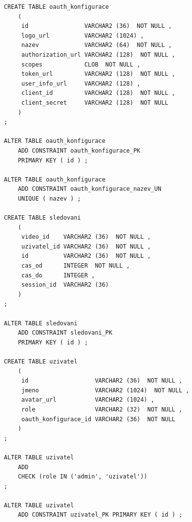 \documentclass[12pt,a4paper]{article}
\begin{document}
\begin{lstlisting}
CREATE TABLE oauth_konfigurace
    (
     id                VARCHAR2 (36)  NOT NULL ,
     logo_url          VARCHAR2 (1024) ,
     nazev             VARCHAR2 (64)  NOT NULL ,
     authorization_url VARCHAR2 (128)  NOT NULL ,
     scopes            CLOB  NOT NULL ,
     token_url         VARCHAR2 (128)  NOT NULL ,
     user_info_url     VARCHAR2 (128) ,
     client_id         VARCHAR2 (128)  NOT NULL ,
     client_secret     VARCHAR2 (128)  NOT NULL
    )
;

ALTER TABLE oauth_konfigurace
    ADD CONSTRAINT oauth_konfigurace_PK
    PRIMARY KEY ( id ) ;

ALTER TABLE oauth_konfigurace
    ADD CONSTRAINT oauth_konfigurace_nazev_UN
    UNIQUE ( nazev ) ;

CREATE TABLE sledovani
    (
     video_id    VARCHAR2 (36)  NOT NULL ,
     uzivatel_id VARCHAR2 (36)  NOT NULL ,
     id          VARCHAR2 (36)  NOT NULL ,
     cas_od      INTEGER  NOT NULL ,
     cas_do      INTEGER ,
     session_id  VARCHAR2 (36)
    )
;

ALTER TABLE sledovani
    ADD CONSTRAINT sledovani_PK
    PRIMARY KEY ( id ) ;

CREATE TABLE uzivatel
    (
     id                   VARCHAR2 (36)  NOT NULL ,
     jmeno                VARCHAR2 (1024)  NOT NULL ,
     avatar_url           VARCHAR2 (1024) ,
     role                 VARCHAR2 (32)  NOT NULL ,
     oauth_konfigurace_id VARCHAR2 (36)  NOT NULL
    )
;

ALTER TABLE uzivatel
    ADD
    CHECK (role IN ('admin', 'uzivatel'))
;

ALTER TABLE uzivatel
    ADD CONSTRAINT uzivatel_PK PRIMARY KEY ( id ) ;
\end{lstlisting}
\end{document}
